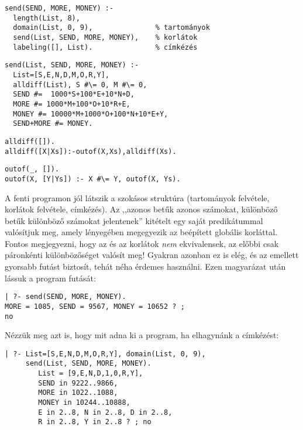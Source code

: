 \begin{verbatim}
send(SEND, MORE, MONEY) :-
  length(List, 8),
  domain(List, 0, 9),               % tartományok 
  send(List, SEND, MORE, MONEY),    % korlátok
  labeling([], List).               % címkézés
\end{verbatim}
\begin{verbatim}
send(List, SEND, MORE, MONEY) :-
  List=[S,E,N,D,M,O,R,Y], 
  alldiff(List), S #\= 0, M #\= 0,
  SEND #=  1000*S+100*E+10*N+D,
  MORE #= 1000*M+100*O+10*R+E,
  MONEY #= 10000*M+1000*O+100*N+10*E+Y,
  SEND+MORE #= MONEY.
\end{verbatim}
\begin{alltt}
% alldiff(L): L elemei mind különbözőek (buta megvalósítás).
% Lényegében azonos a beépített all_different/1 kombinatorikai globális korláttal.
alldiff([]).
alldiff([X|Xs]) :- outof(X, Xs), alldiff(Xs).
\end{alltt}
\begin{verbatim}
outof(_, []).
outof(X, [Y|Ys]) :- X #\= Y, outof(X, Ys).
\end{verbatim}

A fenti programon jól látszik a szokásos \clpfd struktúra (tartományok
felvétele, korlátok felvétele, címkézés). Az ,,azonos betűk azonos számokat,
különböző betűk különböző számokat jelentenek'' kitételt egy saját
 predikátummal valósítjuk meg, amely lényegében megegyezik
az  beépített globális korláttal. Fontos megjegyezni,
hogy az  és az  korlátok \emph{nem}
ekvivalensek, az előbbi csak páronkénti különbözőséget valósít meg! Gyakran
azonban ez is elég, és az  emellett gyorsabb futást biztosít,
tehát néha érdemes használni. Ezen magyarázat után lássuk a program futását:

\begin{verbatim}
| ?- send(SEND, MORE, MONEY).
MORE = 1085, SEND = 9567, MONEY = 10652 ? ;
no
\end{verbatim}

Nézzük meg azt is, hogy mit adna ki a program, ha elhagynánk a címkézést:

\begin{verbatim}
| ?- List=[S,E,N,D,M,O,R,Y], domain(List, 0, 9), 
     send(List, SEND, MORE, MONEY).
        List = [9,E,N,D,1,0,R,Y],
        SEND in 9222..9866,
        MORE in 1022..1088,
        MONEY in 10244..10888,
        E in 2..8, N in 2..8, D in 2..8, 
        R in 2..8, Y in 2..8 ? ; no
\end{verbatim}


